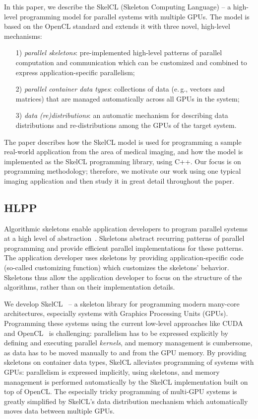 In this paper, we describe the SkelCL (Skeleton Computing Language) -- a high-level programming model for parallel systems with multiple GPUs.
The model is based on the OpenCL standard and extends it with three novel, high-level mechanisms:
\begin{itemize}
  \item[1)] \emph{parallel skeletons}: pre-implemented high-level patterns of parallel computation and communication which can be customized and combined to express application-specific parallelism;
  \item[2)] \emph{parallel container data types}: collections of data (e.\,g., vectors and matrices) that are managed automatically across all GPUs in the system;
  \item[3)] \emph{data (re)distributions}: an automatic mechanism for describing data distributions and re-distributions among the GPUs of the target system.
\end{itemize}

The paper describes how the SkelCL model is used for programming a sample real-world application from the area of medical imaging, and how the model is implemented as the SkelCL programming library, using C++.
Our focus is on programming methodology;
therefore, we motivate our work using one typical imaging application and then study it in great detail throughout the paper.

\subsection{HLPP}
Algorithmic skeletons enable application developers to program parallel systems at a high level of abstraction~\cite{Cole1991}.
Skeletons abstract recurring patterns of parallel programming and provide efficient parallel implementations for these patterns.
The application developer uses skeletons by providing application-specific code (so-called customizing function) which customizes the skeletons' behavior.
Skeletons thus allow the application developer to focus on the structure of the algorithms, rather than on their implementation details.

We develop SkelCL~\cite{SteuwerKeGo2012} -- a skeleton library for programming modern many-core architectures, especially systems with Graphics Processing Units (GPUs).
Programming these systems using the current low-level approaches like CUDA~\cite{CUDAProgrammingGuide} and OpenCL~\cite{OpenCL} is challenging: parallelism has to be expressed explicitly by defining and executing parallel \emph{kernels}, and memory management is cumbersome, as data has to be moved manually to and from the GPU memory.
By providing skeletons on container data types, SkelCL alleviates programming of systems with GPUs:
parallelism is expressed implicitly, using skeletons, and memory management is performed automatically by the SkelCL implementation built on top of OpenCL.
The especially tricky programming of multi-GPU systems is greatly simplified by SkelCL's data distribution mechanism which automatically moves data between multiple GPUs.

